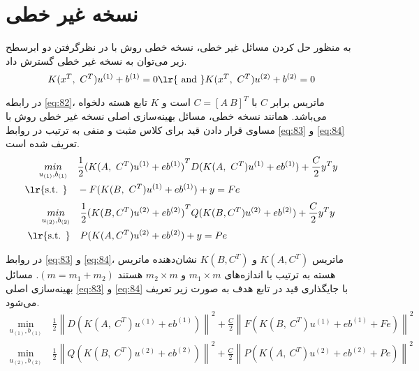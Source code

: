 \section{نسخه غیر خطی}\label{sec:3:3}
به منظور حل کردن مسائل غیر خطی، نسخه خطی روش  با در نظرگرفتن دو ابرسطح  زیر می‌توان به نسخه غیر خطی گسترش داد.
\begin{equation}\label{eq:82}
K({{x}^{T}},~{{C}^{T}}){{u}^{\left( 1 \right)}}+{{b}^{\left( 1 \right)}}=0 \text{\lr{ and }} K({{x}^{T}},~{{C}^{T}}){{u}^{\left( 2 \right)}}+{{b}^{\left( 2 \right)}}=0
\end{equation}

در رابطه \ref{eq:82}، ماتریس برابر $C$ با  $C=\left[ A \  B \right]^{T}$ است و $K$  تابع هسته دلخواه می‌باشد. همانند نسخه خطی، مسائل بهینه‌سازی اصلی نسخه غیر خطی روش   با مساوی قرار دادن قید برای کلاس مثبت و منفی به ترتیب در روابط \ref{eq:83} و \ref{eq:84} تعریف شده است.
\begin{align}
\mathop{{ min}}\limits_{u_{(1)} ,b_{(1)}} \quad & \frac{1}{2}{{(K(A,~{{C}^{T}}){{u}^{\left( 1 \right)}}+e{{b}^{\left( 1 \right)}})}^{T}}D(K( A,~{{C}^{T}}){{u}^{\left( 1 \right)}} \nonumber +e{{b}^{\left( 1 \right)}}) +\frac{C}{2}{{y}^{T}}y \nonumber \\
\textrm{\lr{s.t. }} \quad & 	-F(K(B,~{{C}^{T}}){{u}^{\left( 1 \right)}}+e{{b}^{\left( 1 \right)}})+y=Fe
\label{eq:83}
\end{align}
\begin{align}
\mathop{{ min}}\limits_{u_{(2)} ,b_{(2)}} \quad & \frac{1}{2}{{(K(B,{{C}^{T}}){{u}^{(2)}}+e{{b}^{(2)}})}^{T}}Q(K(B,{{C}^{T}}){{u}^{(2)}} \nonumber +e{{b}^{(2)}})+\frac{C}{2}{{y}^{T}}y \nonumber \\
\textrm{\lr{s.t. }} \quad & P(K(A,{{C}^{T}}){{u}^{(2)}}+e{{b}^{(2)}})+y=Pe
\label{eq:84}
\end{align}

در روابط \ref{eq:83} و \ref{eq:84}، ماتریس  $K(A,{{C}^{T}})$ و $K(B,{{C}^{T}})$  نشان‌دهنده ماتریس هسته به ترتیب با اندازه‌های  $m_1 \times m$ و  $m_2 \times m$ هستند $(m=m_1+m_2)$. مسائل بهینه‌سازی اصلی \ref{eq:83} و \ref{eq:84} با جایگذاری قید در تابع هدف به صورت زیر تعریف می‌شود.
\begin{equation}\label{eq:85}
\begin{split}
\mathop{{ min}}\limits_{u_{(1)} ,b_{(1)}}~ & \frac{1}{2}\left\|D(K(A,~{{C}^{T}}){{u}^{\left( 1 \right)}}+e{{b}^{\left( 1 \right)}})\right\|^{2} +\frac{C}{2}\left\|F(K(B,~{{C}^{T}}){{u}^{\left( 1 \right)}}+e{{b}^{\left( 1 \right)}}+F{{e}})\right\|^{2}
\end{split}
\end{equation}
\begin{equation}\label{eq:86}
\begin{split}
\mathop{{ min}}\limits_{u_{(2)} ,b_{(2)}}~ & \frac{1}{2}\left\|Q(K(B,~{{C}^{T}} ){{u}^{\left( 2 \right)}}+e{{b}^{\left( 2 \right)}})\right\|^{2} +\frac{C}{2}\left\|P(K(A,~{{C}^{T}} ){{u}^{\left( 2 \right)}}+e{{b}^{\left( 2 \right)}}+P{{e}})\right\|^{2}
\end{split}
\end{equation}

